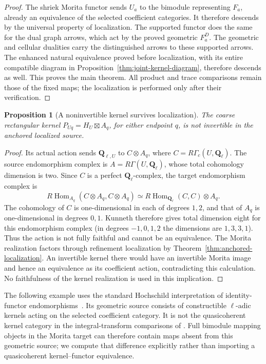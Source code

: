 \documentclass[11pt]{article}
\newtheorem{proposition}{Proposition}[section]
\theoremstyle{definition}
\theoremstyle{remark}
\newcommand{\Q}{\mathbf Q_\ell}
\newcommand{\RHom}{R\operatorname{Hom}}
\begin{document}
\begin{proof}
The shriek Morita functor sends $U_a$ to the bimodule representing
$F_a$, already an equivalence of the selected coefficient categories.
It therefore descends by the universal property of localization.
The supported functor does the same for the dual graph arrows, which
act by the proved geometric $F_a^D$.  The geometric and cellular
dualities carry the distinguished arrows to these supported arrows.
The enhanced natural equivalence proved before localization, with
its entire compatible diagram in Proposition~\ref{thm:joint-kernel-diagram},
therefore descends as well.  This proves the main theorem.
All product and trace comparisons remain those of the fixed maps;
the localization is performed only after their verification.
\end{proof}

\begin{proposition}[A noninvertible kernel survives localization]
\label{prop:noninvertible-rectangle}
The coarse rectangular kernel $P_{Uq}=H_U\boxtimes A_q$, for either
endpoint $q$, is not invertible in the anchored localized source.
\end{proposition}
\begin{proof}
Its actual action sends $\mathbf Q_{\ell,U}$ to $C\otimes A_q$, where
$C=R\Gamma_c(U,\Q)$.  The source endomorphism complex is
$A=R\Gamma(U,\Q)$, whose total cohomology dimension is two.  Since
$C$ is a perfect $\Q$-complex, the target endomorphism complex is
\[
 \RHom_{A_q}(C\otimes A_q,C\otimes A_q)
   \simeq\RHom_{\Q}(C,C)\otimes A_q.
\]
The cohomology of $C$ is one-dimensional in each of degrees $1,2$,
and that of $A_q$ is one-dimensional in degrees $0,1$.  Kunneth
therefore gives total dimension eight for this endomorphism complex
(in degrees $-1,0,1,2$ the dimensions are $1,3,3,1$).
Thus the action is not fully faithful and cannot be an equivalence.
The Morita realization factors through refinement localization by
Theorem~\ref{thm:anchored-localization}.  An invertible kernel there
would have an invertible Morita image and hence an equivalence as
its coefficient action, contradicting this calculation.  No faithfulness
of the kernel realization is used in this implication.
\end{proof}

The following example uses the standard Hochschild interpretation
of identity-functor endomorphisms~\cite{ToenMorita}.  Its geometric
source consists of constructible $\ell$-adic kernels acting on the
selected coefficient category.  It is not the quasicoherent kernel
category in the integral-transform comparisons of
\cite{BFNTransforms}.  Full bimodule mapping objects in the Morita
target can therefore contain maps absent from this geometric source;
we compute that difference explicitly rather than importing a
quasicoherent kernel--functor equivalence.
\end{document}
